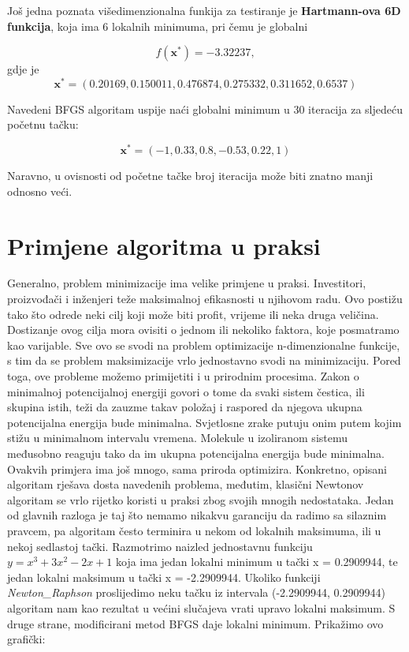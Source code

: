 \documentclass[bosnian,12pt,a4paper]{report}
\begin{document}
\vspace*{0.75cm}

\justify
Još jedna poznata višedimenzionalna funkija za testiranje je \textbf{Hartmann-ova 6D funkcija}, koja ima 6 lokalnih minimuma, pri čemu je globalni

$$f(\textbf{x}^*) = -3.32237,$$ gdje je $$\textbf{x}^* = (0.20169, 0.150011, 0.476874, 0.275332, 0.311652, 0.6537)$$


\justify
Navedeni BFGS algoritam uspije naći globalni minimum u 30 iteracija za sljedeću početnu tačku:

$$\textbf{x}^* = (-1, 0.33, 0.8, -0.53, 0.22, 1)$$


\justify
Naravno, u ovisnosti od početne tačke broj iteracija može biti znatno manji odnosno veći.


\chapter{Primjene algoritma u praksi}


\justify
Generalno, problem minimizacije ima velike primjene u praksi. Investitori, proizvođači i inženjeri teže maksimalnoj efikasnosti u njihovom radu. Ovo postižu tako što odrede neki cilj koji može biti profit, vrijeme ili neka druga veličina. Dostizanje ovog cilja mora ovisiti o jednom ili nekoliko faktora, koje posmatramo kao varijable. Sve ovo se svodi na problem optimizacije n-dimenzionalne funkcije, s tim da se problem maksimizacije vrlo jednostavno svodi na minimizaciju.
\justify
Pored toga, ove probleme možemo primijetiti i u prirodnim procesima. Zakon o minimalnoj potencijalnoj energiji govori o tome da svaki sistem čestica, ili skupina istih, teži da zauzme takav položaj i raspored da njegova ukupna potencijalna energija bude minimalna.  Svjetlosne zrake putuju onim putem kojim stižu u minimalnom intervalu vremena. Molekule u izoliranom sistemu međusobno reaguju tako da im ukupna potencijalna energija bude minimalna. Ovakvih primjera ima još mnogo, sama priroda optimizira.
\justify
Konkretno, opisani algoritam rješava dosta navedenih problema, međutim, klasični Newtonov algoritam se vrlo rijetko koristi u praksi zbog svojih mnogih nedostataka. Jedan od glavnih razloga je taj što nemamo nikakvu garanciju da radimo sa silaznim pravcem, pa algoritam često terminira u nekom od lokalnih maksimuma, ili u nekoj sedlastoj tački. 
\justify
Razmotrimo naizled jednostavnu funkciju $y = x^3 + 3x^2 - 2x + 1$ koja ima jedan lokalni minimum u tački x = 0.2909944, te jedan lokalni maksimum u tački x = -2.2909944. Ukoliko funkciji \textit{Newton_Raphson} proslijedimo neku tačku iz intervala (-2.2909944, 0.2909944) algoritam nam kao rezultat u većini slučajeva vrati upravo lokalni maksimum. S druge strane, modificirani metod BFGS daje lokalni minimum. Prikažimo ovo grafički:\\
\end{document}
